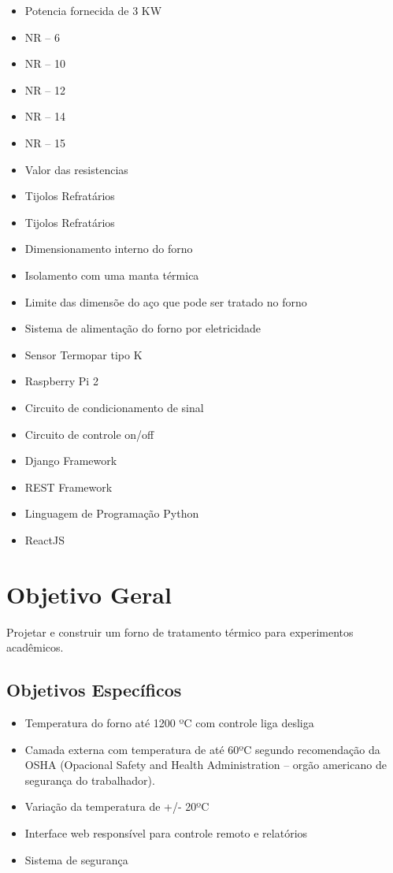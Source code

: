 \begin{itemize}
	\item Potencia fornecida de 3 KW
	\item NR – 6
	\item NR – 10
	\item NR – 12
	\item NR – 14
	\item NR – 15
	\item Valor das resistencias 
	\item Tijolos Refratários 
	\item Tijolos Refratários 
	\item Dimensionamento interno do forno  
	\item Isolamento com uma manta térmica 
	\item Limite das dimensõe do aço que pode ser tratado no forno 
	\item Sistema de alimentação do forno por eletricidade 
	\item Sensor Termopar tipo K
	\item Raspberry Pi 2
	\item Circuito de condicionamento de sinal
	\item Circuito de controle on/off
	\item Django Framework
	\item REST Framework
	\item Linguagem de Programação Python
	\item ReactJS
\end{itemize}

\section{Objetivo Geral}

Projetar e construir um forno de tratamento térmico para experimentos acadêmicos.

\subsection{Objetivos Específicos}

\begin{itemize}
	\item Temperatura do forno até 1200 ºC com controle liga desliga
	\item Camada externa com temperatura de até 60ºC segundo recomendação da OSHA (Opacional Safety and Health Administration – orgão americano de segurança do trabalhador).
	\item Variação da temperatura de +/- 20ºC
	\item Interface web responsível para controle remoto e relatórios
	\item Sistema de segurança
	
\end{itemize}
